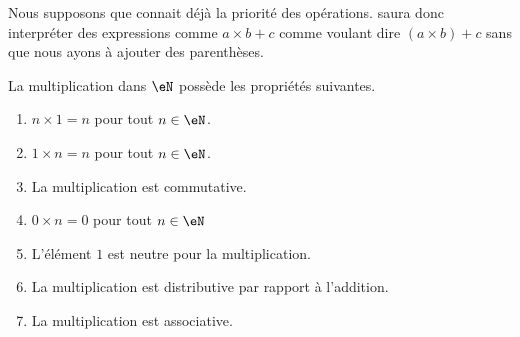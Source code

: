\begin{normaltext}	\label{NORMooPrioriteOperations}
	Nous supposons que  connait déjà la priorité des opérations.  saura donc interpréter des expressions comme \( a\times b+c\) comme voulant dire \( (a\times b)+c\) sans que nous ayons à ajouter des parenthèses.
\end{normaltext}

\begin{proposition}     \label{PROPooGHDOooFYRmon}
	La multiplication dans \( \eN \) possède les propriétés suivantes.
	\begin{enumerate}
		\item       \label{ITEMooHFWRooDCEpjj}
		      \( n\times 1=n\) pour tout \( n\in \eN\).
		\item       \label{ITEMooRSYMooSUrRsl}
		      \( 1\times n=n\) pour tout \( n\in \eN\).
		\item       \label{ITEMooWJPOooRUYjwQ}
		      La multiplication est commutative.
		\item       \label{ITEMooNBYKooXnGRrf}
		      \( 0\times n=0\) pour tout \( n\in \eN\)
		\item      \label{ITEMooLJQBooVpUxUv}
		      L'élément \( 1\) est neutre pour la multiplication.
		\item       \label{ITEMooDYLIooETIBEL}
		      La multiplication est distributive par rapport à l'addition.
		\item       \label{ITEMooQBFSooWGDQYX}
		      La multiplication est associative.
	\end{enumerate}
\end{proposition}

